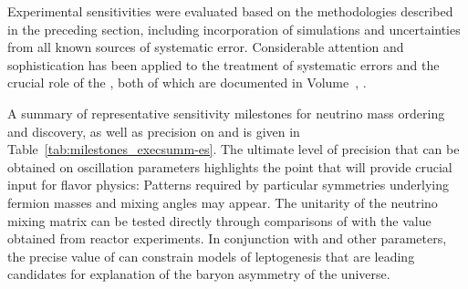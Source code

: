 Experimental sensitivities were evaluated 
based on the methodologies described in the preceding section, 
including incorporation of  simulations 
and uncertainties from all known sources of systematic error.  
Considerable attention and sophistication 
has been applied to the treatment of systematic errors and the crucial role of the , 
both of which are documented in 
Volume~\volnumberphysics{}, \voltitlephysics{}.



A summary of representative sensitivity milestones for neutrino 
mass ordering and  discovery, as well as precision on 
\deltacp and  is given in 
Table~\ref{tab:milestones_execsumm-es}.  
The ultimate level of 
precision that can be obtained on oscillation parameters 
highlights the point that  will provide crucial input for  
flavor physics:  Patterns required by particular symmetries 
underlying fermion masses and mixing angles may appear.  The 
unitarity of the neutrino mixing matrix can be tested directly 
through comparisons of  with the value obtained from 
reactor experiments.  In conjunction with  and 
other parameters, the precise value of \deltacp can  
constrain models of leptogenesis that are leading 
candidates for explanation of the baryon asymmetry of the universe.

